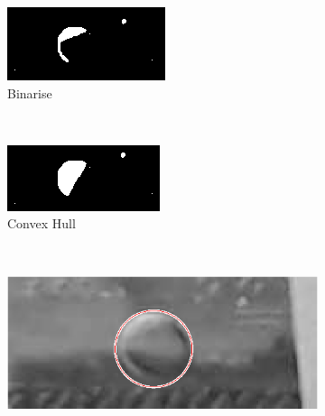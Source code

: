 \documentclass{physics_article_B}
\begin{document}
\begin{figure}[H]
                    \begin{subfigure}[b]{0.3\textwidth}
                        \includegraphics[width=\textwidth]{Figures/SizeFinder/SizeFinder4.eps}
                        \caption{Binarise}
                        \label{fig:size:4}
                    \end{subfigure}
                    ~ 
                    \begin{subfigure}[b]{0.3\textwidth}
                        \includegraphics[width=\textwidth]{Figures/SizeFinder/SizeFinder5.eps}
                        \caption{Convex Hull}
                        \label{fig:size:5}
                    \end{subfigure}
                    ~  
                    \begin{subfigure}[b]{0.3\textwidth}
                        \includegraphics[width=\textwidth]{Figures/SizeFinder/SizeFinder6.eps}

\end{subfigure}
\end{figure}
\end{document}
